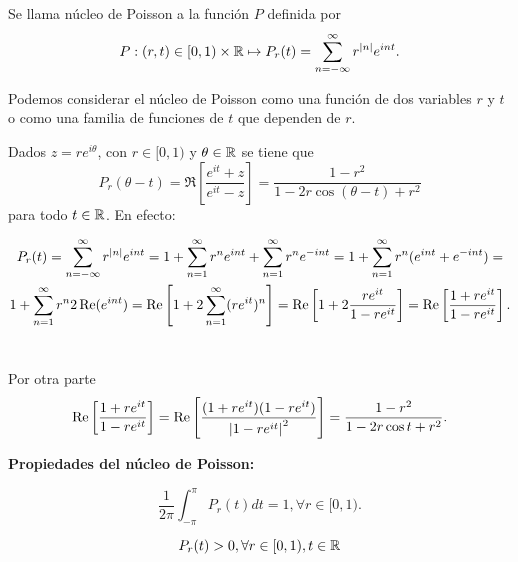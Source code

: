 \begin{definition}
    Se llama núcleo de Poisson a la función $P$ definida por
    \begin{equation}
        \label{poisson1}
        P:(r,t) \in [0,1)\times \mathbb{R} \mapsto P_r(t) = \sum_{n=-\infty}^{\infty} r^{\left\lvert n\right\rvert}e^{int}.
    \end{equation}

    Podemos considerar el núcleo de Poisson como una función de dos variables $r$ y $t$ o como una familia de funciones de $t$ que dependen de $r$.

    Dados $z=re^{i \theta}$, con $r \in [0,1)$ y $\theta \in \mathbb{R}$ se tiene que
    \begin{equation}
        \label{poisson2}
        P_r(\theta - t) = \Re \left[ \dfrac{e^{it} + z}{e^{it} - z} \right] = \dfrac{1 - r^2}{1 - 2r \cos (\theta - t) + r^2}
    \end{equation}
    para todo $t \in \mathbb{R}$. En efecto:

    \begin{multline*}
        P_r(t) = \sum_{n=-\infty}^{\infty} r^{\left\lvert n\right\rvert}e^{int} = 1 + \sum_{n=1}^{\infty} r^n e^{int} + \sum_{n=1}^{\infty} r^n e^{-int} = 1 + \sum_{n=1}^{\infty} r^n (e^{int} + e^{-int}) = \\
        1 + \sum_{n=1}^{\infty} r^n 2 \operatorname{Re}(e^{int}) = \operatorname{Re} \left[ 1 + 2 \sum_{n=1}^{\infty} (r e^{it})^n  \right] = \operatorname{Re} \left[ 1 + 2 \dfrac{re^{it}}{1-re^{it}} \right] = \operatorname{Re} \left[\dfrac{1 + re^{it}}{1-re^{it}} \right].
    \end{multline*}
    \\ \par
    Por otra parte
    \begin{equation*}
        \operatorname{Re} \left[ \dfrac{1 + re^{it}}{1-re^{it}} \right] = \operatorname{Re} \left[ \dfrac{(1 + re^{it})(1 - re^{it})}{\left\lvert1-re^{it}\right\rvert^2} \right] = \dfrac{1 - r^2}{1 - 2r \cos t + r^2}.
    \end{equation*}
\end{definition}

\newpage

\textbf{Propiedades del núcleo de Poisson:}%

\begin{equation}
    \dfrac{1}{2 \pi} \int_{- \pi}^{\pi} P_r (t) dt = 1, \forall r \in [0,1).
\end{equation}

\begin{equation}
    P_r(t) > 0, \forall r \in [0,1), t \in \mathbb{R}
\end{equation}


